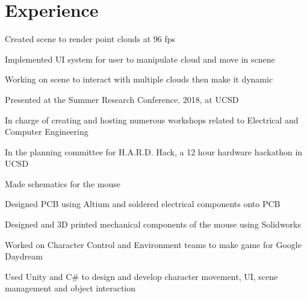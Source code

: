 \documentclass[]{deedy-resume-openfont}
\begin{document}
\begin{minipage}[t]{0.66\textwidth} 


\section{Experience}

\sectionsep
\begin{tightemize}
\item Created scene to render point clouds at 96 fps
\item Implemented UI system for user to manipulate cloud and move in scnene
\item Working on scene to interact with multiple clouds then make it dynamic
\item Presented at the Summer Research Conference, 2018, at UCSD
\end{tightemize}
\sectionsep

\begin{tightemize}
\item In charge of creating and hosting numerous workshops related to Electrical and Computer Engineering
\item In the planning committee for H.A.R.D. Hack, a 12 hour hardware hackathon in UCSD
\end{tightemize}
\sectionsep


\begin{tightemize}
\item Made schematics for the mouse
\item Designed PCB using Altium and soldered electrical components onto PCB
\item Designed and 3D printed mechanical components of the mouse using Solidworks
\end{tightemize}
\sectionsep

\begin{tightemize} 
\item Worked on Character Control and Environment teams to make game for Google Daydream
\item Used Unity and C\# to design and develop character movement, UI, scene management and object interaction
\end{tightemize}
\sectionsep


\end{minipage}
\end{document}
